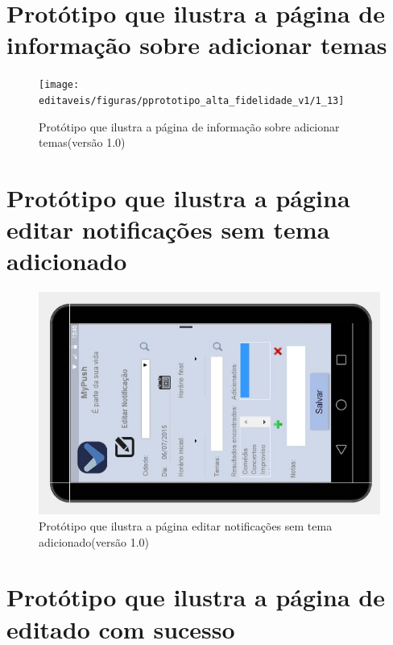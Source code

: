 \begin{apendicesenv}
      \section*{Protótipo que ilustra a página de informação sobre adicionar temas}

    \begin{figure}[!htbp]
      \centering
      \texttt{[image: editaveis/figuras/pprototipo\_alta\_fidelidade\_v1/1\_13]}
      \caption{Protótipo que ilustra a página de informação sobre adicionar temas(versão 1.0)}
      \label{v1}
    \end{figure}
    
      \section*{Protótipo que ilustra a página editar notificações sem tema adicionado}

    \begin{figure}[!htbp]
      \centering
      \includegraphics[scale=0.5, angle=-90]{editaveis/figuras/prototipo_alta_fidelidade_v1/1_14}
      \caption{Protótipo que ilustra a página editar notificações sem tema adicionado(versão 1.0)}
      \label{v1}
    \end{figure}
    
      \section*{Protótipo que ilustra a página de editado com sucesso}


\end{apendicesenv}
